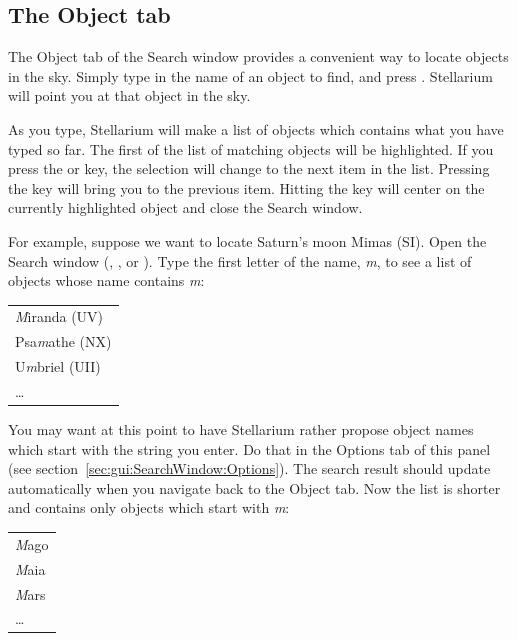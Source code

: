 \subsection{The Object tab}
\label{sec:gui:SearchWindow:Object}
The Object tab of the Search window provides a convenient way to locate objects
in the sky. Simply type in the name of an object to find, and press
\key{\return}. Stellarium will point you at that object in the sky.

As you type, Stellarium will make a list of objects which contains 
what you have typed so far. The first of the list of matching objects
will be highlighted. If you press the \key{\tab} or \key{\arrowkeydown} key,
the selection will change to the next item in the list.
Pressing the \key{\arrowkeyup} key will bring you to the previous item.
Hitting the \key{\return} key will center on the
currently highlighted object and close the Search window.

For example, suppose we want to locate Saturn's moon Mimas (SI).
Open the Search window (, , or ).
Type the first letter of the name, \emph{m}, to see a list
of objects whose name contains \emph{m}:
\begin{center}
\begin{tabular}{l}
        \emph{M}iranda (UV)\\
        Psa\emph{m}athe (NX)\\
        U\emph{m}briel (UII)\\
        \ldots\\
\end{tabular}
\end{center}

\noindent You may want at this point to have Stellarium rather propose object
names which start with the string you enter. Do that in the Options tab
of this panel (see section~\ref{sec:gui:SearchWindow:Options}).
The search result should update automatically
when you navigate back to the Object tab.
Now the list is shorter and contains only objects which start
with \emph{m}:
\begin{center}
\begin{tabular}{l}
        \emph{M}ago\\
        \emph{M}aia\\
        \emph{M}ars\\
        \ldots\\
\end{tabular}
\end{center}

